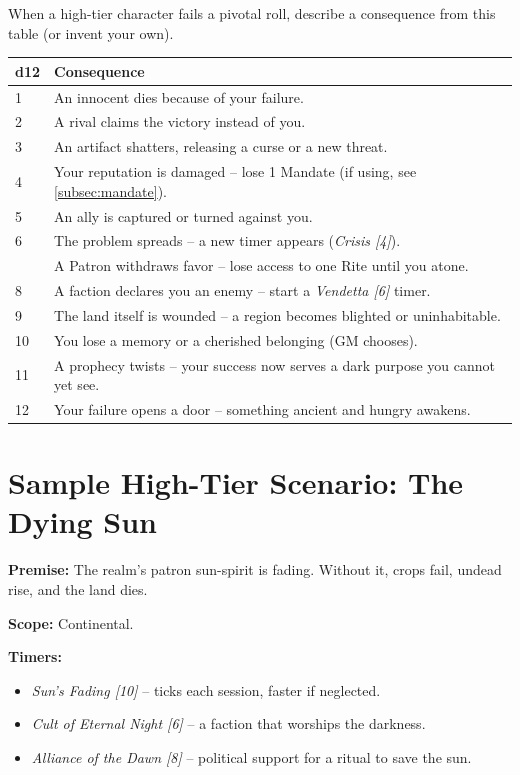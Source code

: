 \begin{tcolorbox}[colback=red!5!white, colframe=red!75!black, title={The Mythic Failure Table (d12)},breakable]

When a high-tier character fails a pivotal roll, describe a consequence from this table (or invent your own).

\small
\begin{tabularx}{\linewidth}{lX}
\toprule
\textbf{d12} & \textbf{Consequence} \\
\midrule
1 & An innocent dies because of your failure. \\
2 & A rival claims the victory instead of you. \\
3 & An artifact shatters, releasing a curse or a new threat. \\
4 & Your reputation is damaged -- lose 1 Mandate (if using, see \ref{subsec:mandate}). \\
5 & An ally is captured or turned against you. \\
6 & The problem spreads -- a new timer appears (\emph{Crisis [4]}). \\
\addlinespace
7 & A Patron withdraws favor -- lose access to one Rite until you atone. \\
8 & A faction declares you an enemy -- start a \emph{Vendetta [6]} timer. \\
9 & The land itself is wounded -- a region becomes blighted or uninhabitable. \\
10 & You lose a memory or a cherished belonging (GM chooses). \\
11 & A prophecy twists -- your success now serves a dark purpose you cannot yet see. \\
12 & Your failure opens a door -- something ancient and hungry awakens. \\
\bottomrule
\end{tabularx}
\normalsize
\end{tcolorbox}

\section{Sample High-Tier Scenario: The Dying Sun}

\textbf{Premise:} The realm's patron sun-spirit is fading. Without it, crops fail, undead rise, and the land dies.

\textbf{Scope:} Continental.

\textbf{Timers:}
\begin{itemize}
  \item \emph{Sun's Fading [10]} -- ticks each session, faster if neglected.
  \item \emph{Cult of Eternal Night [6]} -- a faction that worships the darkness.
  \item \emph{Alliance of the Dawn [8]} -- political support for a ritual to save the sun.
\end{itemize}

